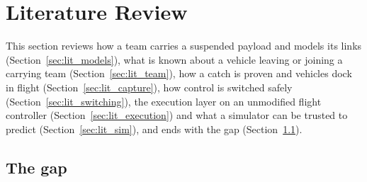 \section{Literature Review}
\label{sec:lit}


This section reviews how a team carries a suspended payload and models its links
(Section~\ref{sec:lit_models}), what is known about a vehicle leaving or joining a carrying team
(Section~\ref{sec:lit_team}), how a catch is proven and vehicles dock in flight (Section~\ref{sec:lit_capture}), how
control is switched safely (Section~\ref{sec:lit_switching}), the execution layer on an unmodified flight controller
(Section~\ref{sec:lit_execution}) and what a simulator can be trusted to predict (Section~\ref{sec:lit_sim}), and ends
with the gap (Section~\ref{sec:lit_gap}).













\subsection{The gap}
\label{sec:lit_gap}

